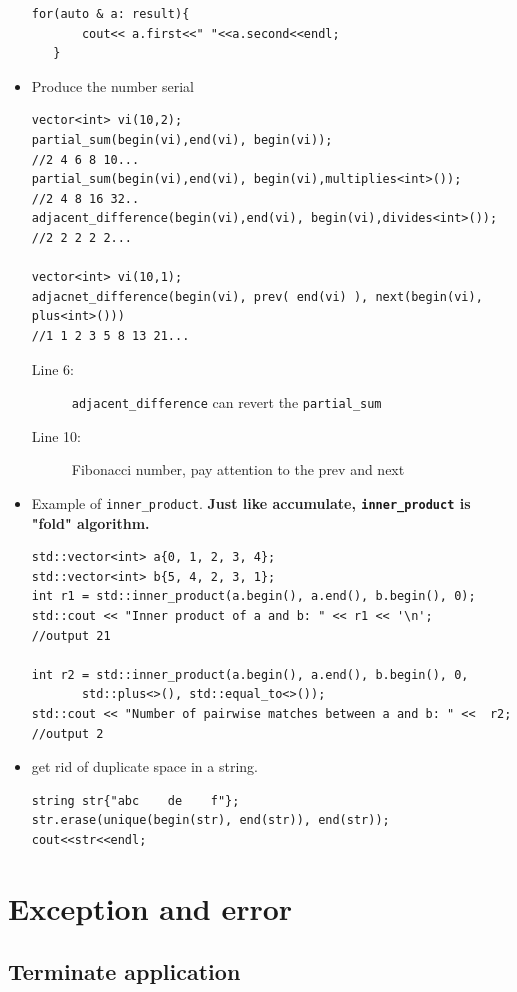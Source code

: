 \documentclass[a4paper,11pt,twoside]{book}
\begin{document}
\begin{itemize}
\begin{lstlisting}
for(auto & a: result){
       cout<< a.first<<" "<<a.second<<endl;
   }
\end{lstlisting}

\item Produce the number serial
\begin{lstlisting}
vector<int> vi(10,2);
partial_sum(begin(vi),end(vi), begin(vi));
//2 4 6 8 10...
partial_sum(begin(vi),end(vi), begin(vi),multiplies<int>());
//2 4 8 16 32..
adjacent_difference(begin(vi),end(vi), begin(vi),divides<int>());
//2 2 2 2 2...

vector<int> vi(10,1);
adjacnet_difference(begin(vi), prev( end(vi) ), next(begin(vi), plus<int>()))
//1 1 2 3 5 8 13 21...
\end{lstlisting}
\begin{description}
\item[Line 6:] \texttt{adjacent\_difference} can revert the \texttt{partial\_sum}
\item[Line 10:] Fibonacci number, pay attention to the prev and next
\end{description}

\item  Example of \texttt{inner\_product}. \textbf{Just like accumulate, \texttt{inner\_product} is "fold" algorithm.}

\begin{lstlisting}
std::vector<int> a{0, 1, 2, 3, 4};
std::vector<int> b{5, 4, 2, 3, 1};
int r1 = std::inner_product(a.begin(), a.end(), b.begin(), 0);
std::cout << "Inner product of a and b: " << r1 << '\n';
//output 21

int r2 = std::inner_product(a.begin(), a.end(), b.begin(), 0,
       std::plus<>(), std::equal_to<>());
std::cout << "Number of pairwise matches between a and b: " <<  r2;
//output 2
\end{lstlisting}

\item get rid of duplicate space in a string.
\begin{lstlisting}
string str{"abc    de    f"};
str.erase(unique(begin(str), end(str)), end(str));
cout<<str<<endl;
\end{lstlisting}

\end{itemize}


\chapter{Exception and error}
\section{Terminate application}
\end{document}
